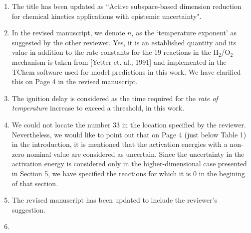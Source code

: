 \documentclass[11pt,final]{article}
\newcommand{\referee}[1]{\vspace{.1ex}\noindent{\textcolor{blue}{#1}}}
\begin{document}
\begin{enumerate}[wide, labelwidth=!, labelindent=0pt]
\item \referee{Why not use the word 'active' in the title, since active subspace is essentially
what has been done here?}

\noindent  The title has been updated as ``Active subspace-based dimension reduction for chemical kinetics
applications with epistemic uncertainty".

\item \referee{3.36 $n_i$ is index or power? Is this an established term for the power of T? 
Also, what are the values of $n_i$'s?}

\noindent  In the revised manuscript, we denote $n_i$ as the `temperature exponent' as suggested by
the other reviewer. Yes, it is an established quantity and its value in addition to the
rate constants for the 19 reactions
in the H$_2$/O$_2$ mechanism is taken from [Yetter et. al., 1991] and implemented in the
TChem software used for model predictions in this work. We have clarified this on Page 4
in the revised manuscript. 

\item \referee{3.51 'rate of temperature' or 'temperature'?}

\noindent  The ignition delay is considered as the time required for the {\it rate of temperature}
increase to exceed a threshold, in this work.

\item \referee{4.57 not clear where the number 33 comes from since we have 19 reactions. I see it is explained at the beginning of Section 5, but it should be noted here briefly, too.}

\noindent  We could not locate the number 33 in the location specified by the reviewer. Nevertheless, we would like
to point out that on Page 4 (just below Table 1) in the introduction, 
it is mentioned that the activation energies with a non-zero nominal value are considered as uncertain. 
Since the uncertainty in the activation energy is considered only in the higher-dimensional case
presented in Section 5, we have
specified the reactions for which it is 0 in the begining of that section.

\item \referee{6.19 distribution-$>$density function}

\noindent  The revised manuscript has been updated to include the reviewer's suggestion. 

\item \referee{6.38: typo, $w_r$ should be $w_1$}


\end{enumerate}
\end{document}
